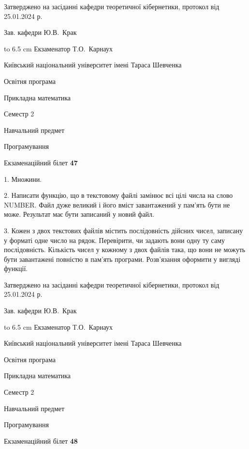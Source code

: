 \documentclass[12pt, ukrainian]{article}
\begin{document}
{\smallskip\smallskip \begin {scriptsize} Затверджено на засіданні кафедри теоретичної кібернетики, протокол   від   25.01.2024 р.\par\smallskip\smallskip\smallskip\smallskip
{\parbox {6.5 cm} {Зав. кафедри \dotfill Ю.В.~Крак}}\hspace {0.7cm} {\hbox to 6.5 cm { Екзаменатор \dotfill Т.О.~Карнаух}} \end{scriptsize}}
\vspace{0.9cm}
{{\begin {scriptsize}\par
{ \center  Київський національний університет імені Тараса Шевченка \par}
{\parbox {5 cm}{Освітня програма \hfill}{\parbox {7 cm}{Прикладна математика\hfill}}\parbox {6 cm}{\hfill Семестр 2}}\par
{\parbox {5 cm} {Навчальний предмет \hfill}\parbox {7 cm}{Програмування \hfill}\parbox {6cm}{\hfill}\par}\vspace{-15pt} \end{scriptsize}}{\center Екзаменаційний білет \No \textbf { 47 }\par}}
{%
1. Множини.%
\par
2. Написати функцію, що в текстовому файлі замінює всі цілі числа на слово NUMBER. Файл дуже великий і його вміст завантажений у пам'ять бути не може. Результат має бути записаний у новий файл.

\par
3. Кожен з двох текстових файлів містить послідовність дійсних чисел, записану у форматі одне число на рядок.  Перевірити, чи задають вони одну ту саму послідовність. Кількість чисел у кожному з двох файлів така, що вони не можуть бути завантажені повністю в пам'ять програми. Розв'язання оформити у вигляді функції.

}
{\smallskip\smallskip \begin {scriptsize} Затверджено на засіданні кафедри теоретичної кібернетики, протокол   від   25.01.2024 р.\par\smallskip\smallskip\smallskip\smallskip
{\parbox {6.5 cm} {Зав. кафедри \dotfill Ю.В.~Крак}}\hspace {0.7cm} {\hbox to 6.5 cm { Екзаменатор \dotfill Т.О.~Карнаух}} \end{scriptsize}}
\vspace{0.9cm}
{{\begin {scriptsize}\par
{ \center  Київський національний університет імені Тараса Шевченка \par}
{\parbox {5 cm}{Освітня програма \hfill}{\parbox {7 cm}{Прикладна математика\hfill}}\parbox {6 cm}{\hfill Семестр 2}}\par
{\parbox {5 cm} {Навчальний предмет \hfill}\parbox {7 cm}{Програмування \hfill}\parbox {6cm}{\hfill}\par}\vspace{-15pt} \end{scriptsize}}{\center Екзаменаційний білет \No \textbf { 48 }\par}}
\end{document}

